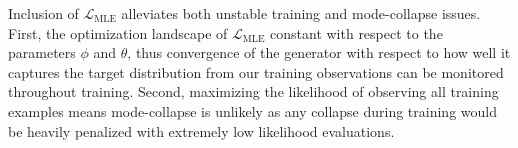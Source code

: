 Inclusion of $\mathcal{L}_{\text{MLE}}$ alleviates both unstable training and mode-collapse issues.
First, the optimization landscape of $\mathcal{L}_{\text{MLE}}$ constant with respect to the parameters $\phi$ and
$\theta$, thus convergence of the generator with respect to how well it captures the target distribution from our
training observations can be monitored throughout training.
Second, maximizing the likelihood of observing all training examples means mode-collapse is unlikely as any collapse
during training would be heavily penalized with extremely low likelihood evaluations.
